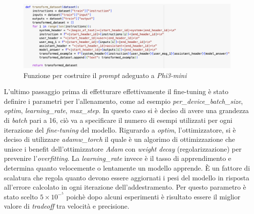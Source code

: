     \begin{figure}[htp]
        \centering        
        \includegraphics[width=14.5cm]{img/promptFormat.pdf}
        \caption{Funzione per costruire il \textit{prompt} adeguato a \textit{Phi3-mini}}
    \end{figure}\newline
    L'ultimo passaggio prima di effetturare effettivamente il \gls{fine-tuning} è stato definire i parametri per l'allenamento, come ad esempio \textit{per\_device\_batch\_size}, \textit{optim}, \textit{learning\_rate}, \textit{max\_step}.
    In questo caso si è deciso di avere una grandezza di \textit{batch} pari a 16, ciò va a specificare il numero di esempi utilizzati per ogni iterazione del \textit{fine-tuning} del modello. 
    Rigurardo a \textit{optim}, l'ottimizzatore, si è deciso di utilizzare \textit{adamw\_torch} il quale è un algorimo di ottimizzazione che unisce i benefit dell'ottimizzatore \textit{Adam} con \textit{weight decay} (regolarizzazione) per prevenire l'\textit{overfitting}.
    La \textit{learning\_rate} invece è il tasso di apprendimento e determina quanto velocemente o lentamente un modello apprende. È un fattore di scalatura che regola quanto devono essere aggiornati i pesi del modello in risposta all'errore calcolato in ogni iterazione dell'addestramento. Per questo parametro è stato scelto $5\times10^-^5$ poichè dopo alcuni esperimenti è risultato essere il miglior valore di \textit{tradeoff} tra velocità e precisione.

